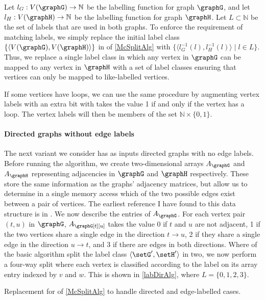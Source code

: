 Let $l_G: V(\graphG) \rightarrow \mathbb{N}$ be the labelling function for graph $\graphG$,
and let $l_H: V(\graphH) \rightarrow \mathbb{N}$ be the labelling function for graph $\graphH$.
Let $L \subset \mathbb{N}$ be the set of labels that are used in both graphs.
To enforce the requirement of matching labels, we simply
replace the initial label class $\{\langle V(\graphG),V(\graphH) \rangle\}$ in 
of \cref{McSplitAlg}
with $\{\langle l_G^{-1}(l), l_H^{-1}(l)\rangle \mid l \in L\}$.  Thus, we replace
a single label class in which any vertex in $\graphG$ can be mapped to any
vertex in $\graphH$ with a set of label classes ensuring that vertices can only
be mapped to like-labelled vertices.

If some vertices have loops, we can use the same procedure by augmenting vertex labels with an extra
bit with takes the value 1 if and only if the vertex has a loop.  The vertex labels will then
be members of the set $\mathbb{N} \times \{0,1\}$.

\paragraph{Directed graphs without edge labels} The next variant we consider has as inputs directed
graphs with no edge labels.
Before running the algorithm,
we create two-dimensional arrays $A_\graphG$ and $A_\graphH$ representing adjacencies in
$\graphG$ and $\graphH$ respectively.  These store the same information as the graphs'
adjacency matrices, but allow us to determine in a single memory access which of
the two possible edges exist between a pair of vertices.  The earliest reference I have
found to this data structure is in \cite{DBLP:conf/wea/Lopez-PresaA09}.
We now describe the entries of $A_\graphG$.
For each vertex pair $(t,u)$ in $\graphG$,
$A_\graphG[t][u]$ takes the value 0 if $t$ and $u$ are not
adjacent, 1 if the two vertices share a single edge in the direction $t
\rightarrow u$, 2 if they share a single edge in the direction $u \rightarrow
t$, and 3 if there are edges in both directions. Where
 of the basic algorithm split the
label class $\langle \setG',\setH' \rangle$ in two, we now perform a four-way split
where each vertex is classified according to the label on its array entry indexed by
$v$ and $w$.  This is shown in \cref{labDirAlg}, where
$L=\{0,1,2,3\}$.

\begin{algorithm}[htb]
\DontPrintSemicolon
\nl    {}
    \caption{Replacement for  of \cref{McSplitAlg} to handle directed and edge-labelled cases.}
\label{labDirAlg}
\end{algorithm}

